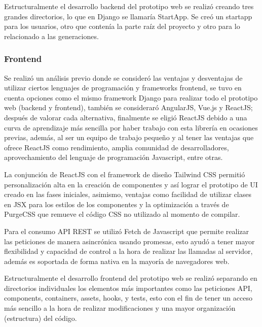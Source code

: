 \documentclass[../Main.tex]{subfiles}
\begin{document}
    \begin{justify}
    Estructuralmente el desarrollo backend del prototipo web se realizó creando tres grandes directorios, lo que en Django se llamaría StartApp. Se creó un startapp para los usuarios, otro que contenía la parte raíz del proyecto y otro para lo relacionado a las generaciones.
    \end{justify}
    
    \subsubsection{Frontend}
    \begin{justify}
    Se realizó un análisis previo donde se consideró las ventajas y desventajas de utilizar ciertos lenguajes de programación y frameworks frontend, se tuvo en cuenta opciones como el mismo framework Django para realizar todo el prototipo web (backend y frontend), también se consideraró AngularJS, Vue.js y ReactJS; después de valorar cada alternativa, finalmente se eligió ReactJS debido a una curva de aprendizaje más sencilla por haber trabajo con esta librería en ocasiones previas, además, al ser un equipo de trabajo pequeño y al tener las ventajas que ofrece ReactJS como rendimiento, amplia comunidad de desarrolladores, aprovechamiento del lenguaje de programación Javascript, entre otras.
    
    La conjunción de ReactJS con el framework de diseño Tailwind CSS permitió personalización alta en la creación de componentes y así lograr el prototipo de UI creado en las fases iniciales, asimismo, ventajas como facilidad de utilizar clases en JSX para los estilos de los componentes y la optimización a través de PurgeCSS que remueve el código CSS no utilizado al momento de compilar.
    
    Para el consumo API REST se utilizó Fetch de Javascript que permite realizar las peticiones de manera asincrónica usando promesas, esto ayudó a tener mayor flexibilidad y capacidad de control a la hora de realizar las llamadas al servidor, además es soportada de forma nativa en la mayoría de navegadores web.
    
    Estructuralmente el desarrollo frontend del prototipo web se realizó separando en directorios individuales los elementos más importantes como las peticiones API, components, containers, assets, hooks,  y tests, esto con el fin de tener un acceso más sencillo a la hora de realizar modificaciones y una mayor organización (estructura) del código.
    \end{justify}
    
\end{document}
